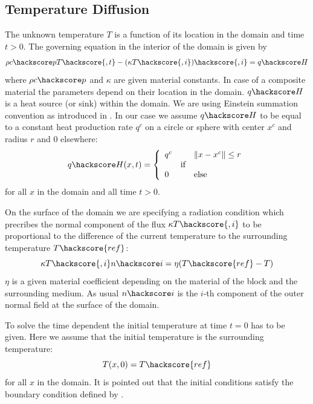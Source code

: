 \subsection{\label{DIFFUSION TEMP SEC}Temperature Diffusion}
The unknown temperature $T$ is a function of its location in the domain and time $t>0$. The governing equation
in the interior of the domain is given by
\begin{equation}
\rho c\hackscore p T\hackscore{,t} - (\kappa T\hackscore{,i})\hackscore{,i} = q\hackscore H
\label{DIFFUSION TEMP EQ 1}
\end{equation}
where $\rho c\hackscore p$ and $\kappa$ are given material constants. In case of a composite
material the parameters depend on their location in the domain. $q\hackscore H$ is
a heat source (or sink) within the domain. We are using Einstein summation convention  
as introduced in . In our case we assume $q\hackscore H$ to be equal to a constant heat production rate 
$q^{c}$ on a circle or sphere with center $x^c$ and radius $r$ and $0$ elsewhere:
\begin{equation}
q\hackscore H(x,t)=
\left\{ 
\begin{array}{lcl}
q^c  & & \|x-x^c\| \le r \\
     & \mbox{if} \\
0    &  & \mbox{else} \\
\end{array}
\right.
\label{DIFFUSION TEMP EQ 1b}
\end{equation}
for all $x$ in the domain and all time  $t>0$.

On the surface of the domain we are 
specifying a radiation condition 
which precribes the normal component of the flux $\kappa T\hackscore{,i}$ to be proportional
to the difference of the current temperature to the surrounding temperature $T\hackscore{ref}$:    
\begin{equation}
 \kappa T\hackscore{,i} n\hackscore i = \eta (T\hackscore{ref}-T) 
\label{DIFFUSION TEMP EQ 2}
\end{equation}
$\eta$ is a given material coefficient depending on the material of the block and the surrounding medium. 
As usual $n\hackscore i$ is the $i$-th component of the outer normal field 
at the surface of the domain. 

To solve the time dependent  the initial temperature at time 
$t=0$ has to be given. Here we assume that the initial temperature is the surrounding temperature:
\begin{equation}
T(x,0)=T\hackscore{ref} 
\label{DIFFUSION TEMP EQ 4}
\end{equation}
for all $x$ in the domain. It is pointed out that 
the initial conditions satisfy the 
boundary condition defined by . 

